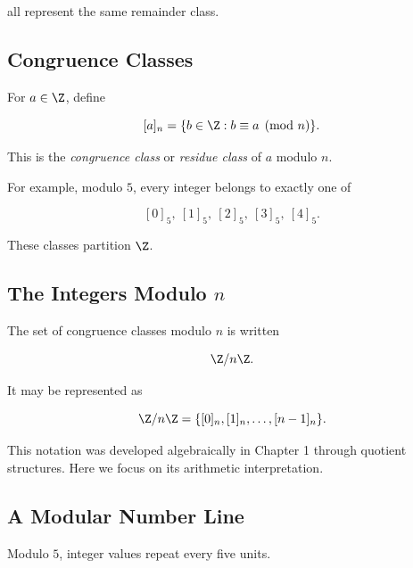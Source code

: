 all represent the same remainder class.

\subsection{Congruence Classes}
\label{subsec:congruence-classes}

For \(a\in\Z\), define

\[ [a]_n=\{b\in\Z:b\equiv a\pmod n\}. \]

This is the \emph{congruence class} or \emph{residue class} of \(a\) modulo
\(n\).

For example, modulo \(5\), every integer belongs to exactly one of

\[ [0]_5,\ [1]_5,\ [2]_5,\ [3]_5,\ [4]_5. \]

These classes partition \(\Z\).

\subsection{The Integers Modulo \(n\)}
\label{subsec:integers-modulo-n}

The set of congruence classes modulo \(n\) is written

\[ \Z/n\Z. \]

It may be represented as

\[ \Z/n\Z=\{[0]_n,[1]_n,\ldots,[n-1]_n\}. \]

This notation was developed algebraically in Chapter 1 through quotient
structures. Here we focus on its arithmetic interpretation.

\subsection{A Modular Number Line}
\label{subsec:modular-number-line}

Modulo \(5\), integer values repeat every five units.

\begin{centereddiagram}
\end{centereddiagram}

